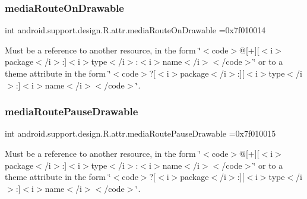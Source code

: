 \subsubsection{\texorpdfstring{media\+Route\+On\+Drawable}{mediaRouteOnDrawable}}
{\footnotesize\ttfamily int android.\+support.\+design.\+R.\+attr.\+media\+Route\+On\+Drawable =0x7f010014\hspace{0.3cm}{\ttfamily [static]}}

Must be a reference to another resource, in the form \char`\"{}$<$code$>$@\mbox{[}+\mbox{]}\mbox{[}$<$i$>$package$<$/i$>$\+:\mbox{]}$<$i$>$type$<$/i$>$\+:$<$i$>$name$<$/i$>$$<$/code$>$\char`\"{} or to a theme attribute in the form \char`\"{}$<$code$>$?\mbox{[}$<$i$>$package$<$/i$>$\+:\mbox{]}\mbox{[}$<$i$>$type$<$/i$>$\+:\mbox{]}$<$i$>$name$<$/i$>$$<$/code$>$\char`\"{}. \mbox{\label{classandroid_1_1support_1_1design_1_1R_1_1attr_a1a5d2fd5b418b463a50cd92cf1e993d5}} 
\subsubsection{\texorpdfstring{media\+Route\+Pause\+Drawable}{mediaRoutePauseDrawable}}
{\footnotesize\ttfamily int android.\+support.\+design.\+R.\+attr.\+media\+Route\+Pause\+Drawable =0x7f010015\hspace{0.3cm}{\ttfamily [static]}}

Must be a reference to another resource, in the form \char`\"{}$<$code$>$@\mbox{[}+\mbox{]}\mbox{[}$<$i$>$package$<$/i$>$\+:\mbox{]}$<$i$>$type$<$/i$>$\+:$<$i$>$name$<$/i$>$$<$/code$>$\char`\"{} or to a theme attribute in the form \char`\"{}$<$code$>$?\mbox{[}$<$i$>$package$<$/i$>$\+:\mbox{]}\mbox{[}$<$i$>$type$<$/i$>$\+:\mbox{]}$<$i$>$name$<$/i$>$$<$/code$>$\char`\"{}. \mbox{\label{classandroid_1_1support_1_1design_1_1R_1_1attr_a7a1ff3b1c6be478e58e84b0ffd9e6325}} 
